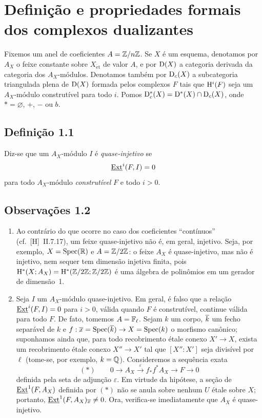 \section{Definição e propriedades formais dos complexos dualizantes}

Fixemos um anel de coeficientes $A = \mathbb{Z}/n\mathbb{Z}$. Se $X$ é um esquema, denotamos por $A_X$ o feixe constante sobre $X_{\mathrm{\acute{e}t}}$ de valor $A$, e por $\mathrm{D}(X)$ a categoria derivada da categoria dos $A_X$-módulos. Denotamos também por $\mathrm{D}_c(X)$ a subcategoria triangulada plena de $\mathrm{D}(X)$ formada pelos complexos $F$ tais que $\mathrm{H}^i(F)$ seja um $A_X$-módulo construtível para todo $i$. Pomos $\mathrm{D}_c^{*}(X) = \mathrm{D}^{*}(X) \cap \mathrm{D}_c(X)$, onde $* = \varnothing$, $+$, $-$ ou $b$.

\subsection*{Definição 1.1}
Diz-se que um $A_X$-módulo $I$ é \emph{quase-injetivo} se
\[
\underline{\operatorname{Ext}}^i(F,I) = 0
\]
para todo $A_X$-módulo \emph{construtível} $F$ e todo $i > 0$.

\subsection*{Observações 1.2}
\begin{enumerate}[label=\alph*)]
\item Ao contrário do que ocorre no caso dos coeficientes ``contínuos'' (cf.~[H]~II.7.17), um feixe quase-injetivo não é, em geral, injetivo. Seja, por exemplo, $X = \operatorname{Spec}(\mathbb R)$ e $A = \mathbb{Z}/2\mathbb{Z}$: o feixe $A_X$ é quase-injetivo, mas não é injetivo, nem sequer tem dimensão injetiva finita, pois $\mathrm{H}^{*}(X; A_X) = \mathrm{H}^{*}(\mathbb{Z}/2\mathbb{Z}; \mathbb{Z}/2\mathbb{Z})$ é uma álgebra de polinômios em um gerador de dimensão~1.

\item Seja $I$ um $A_X$-módulo quase-injetivo. Em geral, é falso que a relação $\underline{\operatorname{Ext}}^i(F,I) = 0$ para $i > 0$, válida quando $F$ é construtível, continue válida para todo $F$. De fato, tomemos $A = \mathbb{F}_{\ell}$. Sejam $k$ um corpo, $\overline{k}$ um fecho separável de $k$ e $f : \overline{x} = \operatorname{Spec}(\overline{k}) \to X = \operatorname{Spec}(k)$ o morfismo canônico; suponhamos ainda que, para todo recobrimento étale conexo $X' \to X$, exista um recobrimento étale conexo $X'' \to X'$ tal que $[X'':X']$ seja divisível por $\ell$ (tome-se, por exemplo, $k = \mathbb{Q}$). Consideremos a sequência exata
\[
(*) \qquad 0 \longrightarrow A_X \xrightarrow{\;\varepsilon\;} f_{*}f^{*}A_X \longrightarrow F \longrightarrow 0
\]
definida pela seta de adjunção $\varepsilon$. Em virtude da hipótese, a seção de $\underline{\operatorname{Ext}}^1(F,A_X)$ definida por $(*)$ não se anula sobre nenhum $U$ étale sobre $X$; portanto, $\underline{\operatorname{Ext}}^1(F,A_X)_{\overline{x}} \neq 0$. Ora, verifica-se imediatamente que $A_X$ é quase-injetivo.
\end{enumerate}

